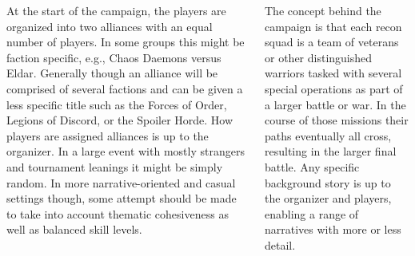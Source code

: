 \begin{columns}
\noindent{}

\columnbreak%


At the start of the campaign, the players are organized into two
alliances with an equal number of players.  In some groups this might
be faction specific, e.g., Chaos Daemons versus Eldar.  Generally
though an alliance will be comprised of several factions and can be
given a less specific title such as the Forces of Order, Legions of
Discord, or the Spoiler Horde.  How players are assigned alliances is
up to the organizer.  In a large event with mostly strangers and
tournament leanings it might be simply random.  In more
narrative-oriented and casual settings though, some attempt should be
made to take into account thematic cohesiveness as well as balanced
skill levels.

The concept behind the campaign is that each recon squad is a team of
veterans or other distinguished warriors tasked with several special
operations as part of a larger battle or war.  In the course of those
missions their paths eventually all cross, resulting in the larger
final battle.  Any specific background story is up to the organizer
and players, enabling a range of narratives with more or less detail.



\end{columns}
